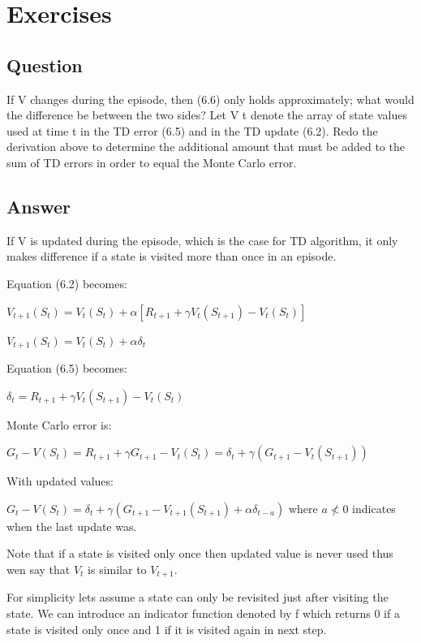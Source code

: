 \documentclass[11pt]{article}
\begin{document}
    \maketitle
    \setcounter{section}{5}


    \section{Exercises}

    \subsection{Question}
    If V changes during the episode, then (6.6) only holds approximately;
    what would the difference be between the two sides?
    Let V t denote the array of state values used at time t in the TD error (6.5) and in the TD update (6.2).
    Redo the derivation above to determine the additional amount that must be added to the sum of TD errors in order to equal the Monte Carlo error.

    \subsection*{Answer}

    If V is updated during the episode, which is the case for TD algorithm, it only makes difference if a state is visited more than once in an episode.

    Equation (6.2) becomes:

    $V_{t+1}(S_t) = V_t(S_t) + \alpha [ R_{t+1} + \gamma V_t(S_{t+1}) -V_t(S_t) ]$

    $V_{t+1}(S_t) = V_t(S_t) + \alpha \delta_t$

    Equation (6.5) becomes:

    $ \delta_t = R_{t+1} + \gamma V_t(S_{t+1}) - V_t(S_t) $

    Monte Carlo error is:

    $G_t-V(S_t) = R_{t+1} + \gamma G_{t+1} - V_t(S_t) = \delta_t + \gamma (G_{t+1} - V_t(S_{t+1})) $

    With updated values:

    $G_t-V(S_t) = \delta_t + \gamma (G_{t+1} - V_{t+1}(S_{t+1}) + \alpha \delta_{t-a}) $ where $a \nless 0$ indicates when the last update was.

    Note that if a state is visited only once then updated value is never used thus wen say that $V_t$ is similar to $V_{t+1}$.


    For simplicity lets assume a state can only be revisited just after visiting the state.
    We can introduce an indicator function denoted by f which returns 0 if a state is visited only once and 1 if it is visited again in next step.
\end{document}
